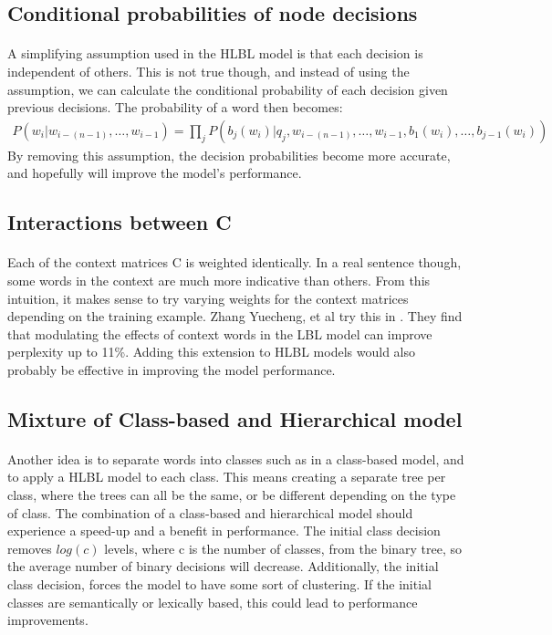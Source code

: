 \subsection{Conditional probabilities of node decisions}
\paragraph{}
A simplifying assumption used in the HLBL model is that each decision is independent of others. This is not true though, and instead of using the assumption, we can calculate the conditional probability of each decision given previous decisions. The probability of a word then becomes:
\begin{align}
P(w_i | w_{i-(n-1)},\dots, w_{i-1})  = \prod_j P(b_j(w_i) | q_j, w_{i-(n-1)},\dots, w_{i-1}, b_1(w_i), \dots, b_{j-1}(w_i))
\end{align}
By removing this assumption, the decision probabilities become more accurate, and hopefully will improve the model's performance.

\subsection{Interactions between C}
\paragraph{}
Each of the context matrices C is weighted identically. In a real sentence though, some words in the context are much more indicative than others. From this intuition, it makes sense to try varying weights for the context matrices depending on the training example. Zhang Yuecheng, et al try this in \cite{Yuecheng2008}. They find that modulating the effects of context words in the LBL model can improve perplexity up to 11\%. Adding this extension to HLBL models would also probably be effective in improving the model performance.

\subsection{Mixture of Class-based and Hierarchical model}
\paragraph{}
Another idea is to separate words into classes such as in a class-based model, and to apply a HLBL model to each class. This means creating a separate tree per class, where the trees can all be the same, or be different depending on the type of class. The combination of a class-based and hierarchical model should experience a speed-up and a benefit in performance. The initial class decision removes $log(c)$ levels, where c is the number of classes, from the binary tree, so the average number of binary decisions will decrease. Additionally, the initial class decision, forces the model to have some sort of clustering. If the initial classes are semantically or lexically based, this could lead to performance improvements.


